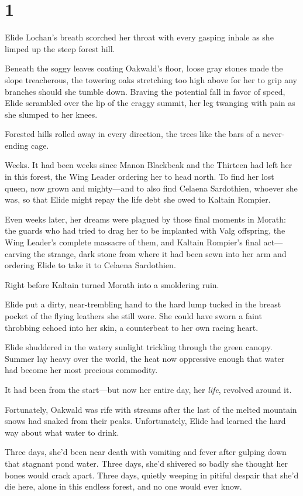 
\chapter{1}

Elide Lochan's breath scorched her throat with every gasping inhale as she limped up the steep forest hill.

Beneath the soggy leaves coating Oakwald's floor, loose gray stones made the slope treacherous, the towering oaks stretching too high above for her to grip any branches should she tumble down. Braving the potential fall in favor of speed, Elide scrambled over the lip of the craggy summit, her leg twanging with pain as she slumped to her knees.

Forested hills rolled away in every direction, the trees like the bars of a never-ending cage.

Weeks. It had been weeks since Manon Blackbeak and the Thirteen had left her in this forest, the Wing Leader ordering her to head north. To find her lost queen, now grown and mighty---and to also find Celaena Sardothien, whoever she was, so that Elide might repay the life debt she owed to Kaltain Rompier.

Even weeks later, her dreams were plagued by those final moments in Morath: the guards who had tried to drag her to be implanted with Valg offspring, the Wing Leader's complete massacre of them, and Kaltain Rompier's final act---carving the strange, dark stone from where it had been sewn into her arm and ordering Elide to take it to Celaena Sardothien.

Right before Kaltain turned Morath into a smoldering ruin.

Elide put a dirty, near-trembling hand to the hard lump tucked in the breast pocket of the flying leathers she still wore. She could have sworn a faint throbbing echoed into her skin, a counterbeat to her own racing heart.

Elide shuddered in the watery sunlight trickling through the green canopy. Summer lay heavy over the world, the heat now oppressive enough that water had become her most precious commodity.

It had been from the start---but now her entire day, her \emph{life}, revolved around it.

Fortunately, Oakwald was rife with streams after the last of the melted mountain snows had snaked from their peaks. Unfortunately, Elide had learned the hard way about what water to drink.

Three days, she'd been near death with vomiting and fever after gulping down that stagnant pond water. Three days, she'd shivered so badly she thought her bones would crack apart. Three days, quietly weeping in pitiful despair that she'd die here, alone in this endless forest, and no one would ever know.

